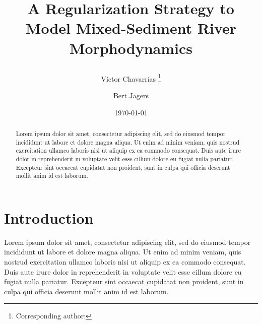 \documentclass[a4paper,10pt,onecolumn]{article} %
\begin{document}
%
%
%
\title{
\begin{center}
\huge{A Regularization Strategy to Model Mixed-Sediment River Morphodynamics}
\vspace{5mm}
\end{center}
}
\date{\today}
\author[1]{V\'ictor Chavarr\'ias \thanks{Corresponding author: }}
\author[1]{Bert Jagers}


%
%
%
\maketitle
%
\begin{abstract}
Lorem ipsum dolor sit amet, \citet{Ribberink85,vanBendegom47,Einstein50,Engelund67,Lane54,deVries71} consectetur adipiscing elit, sed do eiusmod tempor incididunt ut labore et dolore magna aliqua. Ut enim ad minim veniam, quis nostrud exercitation ullamco laboris nisi ut aliquip ex ea commodo consequat. Duis aute irure dolor in reprehenderit in voluptate velit esse cillum dolore eu fugiat nulla pariatur. Excepteur sint occaecat cupidatat non proident, sunt in culpa qui officia deserunt mollit anim id est laborum.
\end{abstract}
%
\vspace{5mm}
%
%
%
\section{Introduction}
\label{sec:int}
%
Lorem ipsum dolor sit amet, \citet{Ribberink85,vanBendegom47,Einstein50,Engelund67,Lane54,deVries71} consectetur adipiscing elit, sed do eiusmod tempor incididunt ut labore et dolore magna aliqua. Ut enim ad minim veniam, quis nostrud exercitation ullamco laboris nisi ut aliquip ex ea commodo consequat. Duis aute irure dolor in reprehenderit in voluptate velit esse cillum dolore eu fugiat nulla pariatur. Excepteur sint occaecat cupidatat non proident, sunt in culpa qui officia deserunt mollit anim id est laborum.
\end{document}
